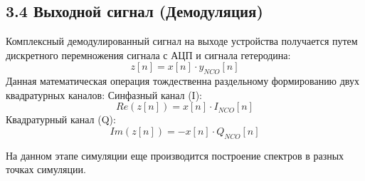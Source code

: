 \subsection*{3.4 Выходной сигнал (Демодуляция)}
Комплексный демодулированный сигнал на выходе устройства получается путем дискретного перемножения сигнала с АЦП и сигнала гетеродина:
\begin{equation}
    z[n] = x[n] \cdot y_{NCO}[n]
\end{equation}
Данная математическая операция тождественна раздельному формированию двух квадратурных каналов: 
Синфазный канал (I):
\begin{equation}
    Re(z[n]) = x[n] \cdot I_{NCO}[n]
\end{equation}
Квадратурный канал (Q):
\begin{equation}
    Im(z[n]) = - x[n] \cdot Q_{NCO}[n]
\end{equation}

На данном этапе симуляции еще производится построение спектров в разных точках симуляции.
